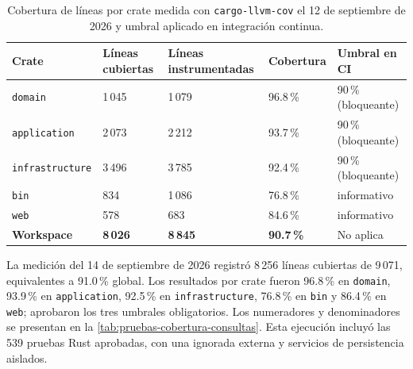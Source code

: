 \begin{table}[H]
  \centering
  \caption[Cobertura por crate del 12 de septiembre de 2026]{Cobertura de líneas por crate medida con \texttt{cargo-llvm-cov} el 12 de septiembre de 2026 y umbral aplicado en integración continua.}
  \label{tab:pruebas-cobertura}
  \begin{tabularx}{\linewidth}{@{}l R{2.2cm} R{2.9cm} R{2.0cm} X@{}}
    \toprule
    \textbf{Crate} & \textbf{Líneas cubiertas} & \textbf{Líneas instrumentadas} & \textbf{Cobertura} & \textbf{Umbral en CI} \\
    \midrule
    \texttt{domain}         & 1\,045 & 1\,079 & 96.8\,\% & 90\,\% (bloqueante) \\
    \texttt{application}    & 2\,073 & 2\,212 & 93.7\,\% & 90\,\% (bloqueante) \\
    \texttt{infrastructure} & 3\,496 & 3\,785 & 92.4\,\% & 90\,\% (bloqueante) \\
    \texttt{bin}            & 834 & 1\,086 & 76.8\,\% & informativo \\
    \texttt{web}            & 578 & 683 & 84.6\,\% & informativo \\
    \midrule
    \textbf{Workspace}      & \textbf{8\,026} & \textbf{8\,845} & \textbf{90.7\,\%} & No aplica \\
    \bottomrule
  \end{tabularx}
\end{table}

La medición del 14 de septiembre de 2026 registró 8\,256 líneas cubiertas de 9\,071, equivalentes a 91.0\,\% global. Los resultados por crate fueron 96.8\,\% en \texttt{domain}, 93.9\,\% en \texttt{application}, 92.5\,\% en \texttt{infrastructure}, 76.8\,\% en \texttt{bin} y 86.4\,\% en \texttt{web}; aprobaron los tres umbrales obligatorios. Los numeradores y denominadores se presentan en la \cref{tab:pruebas-cobertura-consultas}. Esta ejecución incluyó las 539 pruebas Rust aprobadas, con una ignorada externa y servicios de persistencia aislados.

